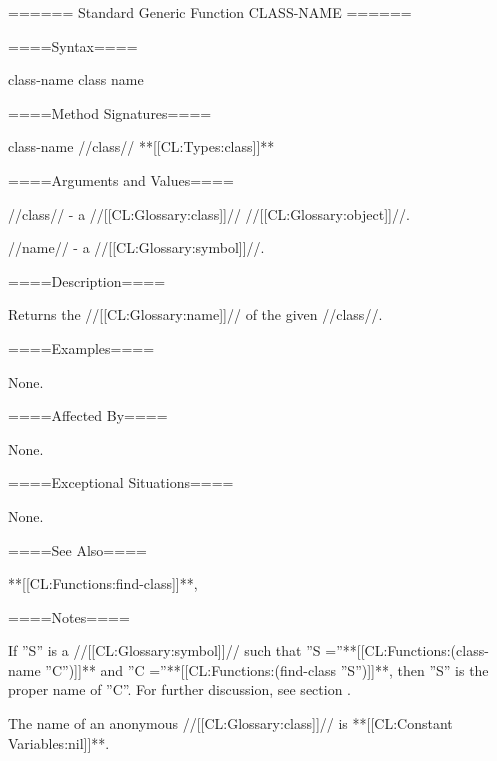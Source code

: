 ====== Standard Generic Function CLASS-NAME ======

====Syntax====

\DefgenWithValues class-name {class} {name}

====Method Signatures====

\Defmeth class-name {//class// **[[CL:Types:class]]**}

====Arguments and Values====

//class// - a //[[CL:Glossary:class]]// //[[CL:Glossary:object]]//.

//name// - a //[[CL:Glossary:symbol]]//.

====Description====

Returns the //[[CL:Glossary:name]]// of the given //class//.

====Examples====

None.

====Affected By====

None.

====Exceptional Situations====

None.

====See Also====

**[[CL:Functions:find-class]]**, {\secref\Classes}

====Notes====

If ''S'' is a //[[CL:Glossary:symbol]]// such that ''S =''**[[CL:Functions:(class-name ''C'')]]** and ''C =''**[[CL:Functions:(find-class ''S'')]]**, then ''S'' is the proper name of ''C''. For further discussion, see section {\secref\Classes}.

The name of an anonymous //[[CL:Glossary:class]]// is **[[CL:Constant Variables:nil]]**.

